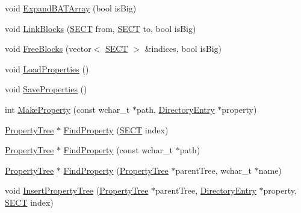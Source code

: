 \begin{DoxyCompactItemize}
\item 
void \hyperlink{class_y_compound_files_1_1_compound_file_af3077ad279646c68ed346c41b81abbf1}{Expand\+B\+A\+T\+Array} (bool is\+Big)
\item 
void \hyperlink{class_y_compound_files_1_1_compound_file_ab81b7da57d0e41bbe74d5663552d45bb}{Link\+Blocks} (\hyperlink{_basic_excel_8hpp_a784c2e2144ab372c047faeeb0f6a9e6b}{S\+E\+C\+T} from, \hyperlink{_basic_excel_8hpp_a784c2e2144ab372c047faeeb0f6a9e6b}{S\+E\+C\+T} to, bool is\+Big)
\item 
void \hyperlink{class_y_compound_files_1_1_compound_file_acf3e12f09235fdc65b526f177e98d638}{Free\+Blocks} (vector$<$ \hyperlink{_basic_excel_8hpp_a784c2e2144ab372c047faeeb0f6a9e6b}{S\+E\+C\+T} $>$ \&indices, bool is\+Big)
\item 
void \hyperlink{class_y_compound_files_1_1_compound_file_ad179c227a22e45e9d8ede6c00da22887}{Load\+Properties} ()
\item 
void \hyperlink{class_y_compound_files_1_1_compound_file_a7c4e2d7eb98cb517d55aae698e93fc98}{Save\+Properties} ()
\item 
int \hyperlink{class_y_compound_files_1_1_compound_file_a526032a834468f88b4fe279972d84c9c}{Make\+Property} (const wchar\+\_\+t $\ast$path, \hyperlink{class_y_compound_files_1_1_compound_file_1_1_directory_entry}{Directory\+Entry} $\ast$property)
\item 
\hyperlink{class_y_compound_files_1_1_compound_file_1_1_property_tree}{Property\+Tree} $\ast$ \hyperlink{class_y_compound_files_1_1_compound_file_a89b6ac366834b96dad306b8afae77fec}{Find\+Property} (\hyperlink{_basic_excel_8hpp_a784c2e2144ab372c047faeeb0f6a9e6b}{S\+E\+C\+T} index)
\item 
\hyperlink{class_y_compound_files_1_1_compound_file_1_1_property_tree}{Property\+Tree} $\ast$ \hyperlink{class_y_compound_files_1_1_compound_file_acb840d5db5b84d5aa8f066f9fc3316d4}{Find\+Property} (const wchar\+\_\+t $\ast$path)
\item 
\hyperlink{class_y_compound_files_1_1_compound_file_1_1_property_tree}{Property\+Tree} $\ast$ \hyperlink{class_y_compound_files_1_1_compound_file_a22ed7fbd2d55f70a456fb3bb49e83e41}{Find\+Property} (\hyperlink{class_y_compound_files_1_1_compound_file_1_1_property_tree}{Property\+Tree} $\ast$parent\+Tree, wchar\+\_\+t $\ast$name)
\item 
void \hyperlink{class_y_compound_files_1_1_compound_file_a0106098f394b20eb07536b3898039ff2}{Insert\+Property\+Tree} (\hyperlink{class_y_compound_files_1_1_compound_file_1_1_property_tree}{Property\+Tree} $\ast$parent\+Tree, \hyperlink{class_y_compound_files_1_1_compound_file_1_1_directory_entry}{Directory\+Entry} $\ast$property, \hyperlink{_basic_excel_8hpp_a784c2e2144ab372c047faeeb0f6a9e6b}{S\+E\+C\+T} index)

\end{DoxyCompactItemize}
